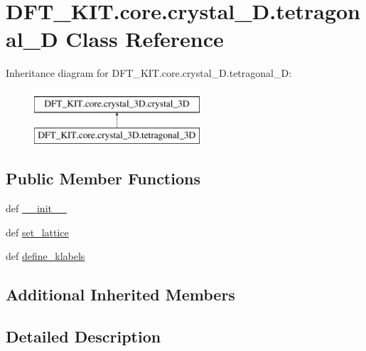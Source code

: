 \hypertarget{class_d_f_t___k_i_t_1_1core_1_1crystal__3_d_1_1tetragonal__3_d}{\section{D\+F\+T\+\_\+\+K\+I\+T.\+core.\+crystal\+\_\+D.\+tetragonal\+\_\+D Class Reference}
\label{class_d_f_t___k_i_t_1_1core_1_1crystal__3_d_1_1tetragonal__3_d}
}
Inheritance diagram for D\+F\+T\+\_\+\+K\+I\+T.\+core.\+crystal\+\_\+D.\+tetragonal\+\_\+D\+:\begin{figure}[H]
\begin{center}
\leavevmode
\includegraphics[height=2.000000cm]{class_d_f_t___k_i_t_1_1core_1_1crystal__3_d_1_1tetragonal__3_d}
\end{center}
\end{figure}
\subsection*{Public Member Functions}
\begin{DoxyCompactItemize}
\item 
def \hyperlink{class_d_f_t___k_i_t_1_1core_1_1crystal__3_d_1_1tetragonal__3_d_a24ae7396b4310496b17aa319e8a2a45e}{\+\_\+\+\_\+init\+\_\+\+\_\+}
\item 
def \hyperlink{class_d_f_t___k_i_t_1_1core_1_1crystal__3_d_1_1tetragonal__3_d_a9302cfb0437f54df09c9cccae87ee513}{set\+\_\+lattice}
\item 
def \hyperlink{class_d_f_t___k_i_t_1_1core_1_1crystal__3_d_1_1tetragonal__3_d_a64368867ccdec5433773434d01a87c97}{define\+\_\+klabels}
\end{DoxyCompactItemize}
\subsection*{Additional Inherited Members}


\subsection{Detailed Description}


